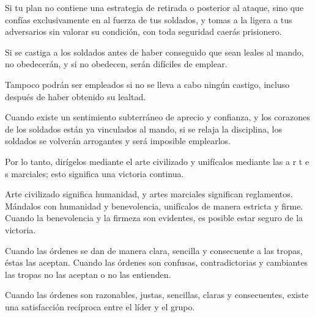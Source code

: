Si tu plan no contiene una estrategia de retirada o posterior al ataque, sino que confías exclusivamente en al fuerza de tus soldados, y tomas a la ligera a tus adversarios sin valorar su condición, con toda seguridad caerás prisionero.

Si se castiga a los soldados antes de haber conseguido que sean leales al mando, no obedecerán, y si no obedecen, serán difíciles de emplear.

Tampoco podrán ser empleados si no se lleva a cabo ningún castigo, incluso después de haber obtenido su lealtad.

Cuando existe un sentimiento subterráneo de aprecio y confianza, y los corazones de los soldados están ya vinculados al mando, si se relaja la disciplina, los soldados se volverán arrogantes y será imposible emplearlos.

Por lo tanto, dirígelos mediante el arte civilizado y unifícalos mediante las a r t e s marciales; esto significa una victoria continua.

Arte civilizado significa humanidad, y artes marciales significan reglamentos. Mándalos con humanidad y benevolencia, unifícalos de manera estricta y firme. Cuando la benevolencia y la firmeza son evidentes, es posible estar seguro de la victoria.

Cuando las órdenes se dan de manera clara, sencilla y consecuente a las tropas, éstas las aceptan. Cuando las órdenes son confusas, contradictorias y cambiantes las tropas no las aceptan o no las entienden.

Cuando las órdenes son razonables, justas, sencillas, claras y consecuentes, existe una satisfacción recíproca entre el líder y el grupo.

